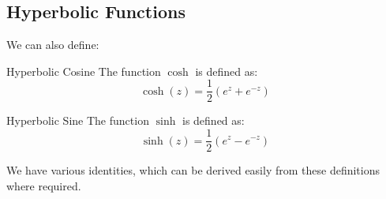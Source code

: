 \documentclass[../Main.tex]{subfiles}
\begin{document}
\subsection{Hyperbolic Functions}
We can also define:
\begin{definition}{Hyperbolic Cosine}
    The function $\cosh$ is defined as:
    \begin{equation*}
        \cosh(z) = \frac{1}{2}\left(e^z + e^{-z}\right)
    \end{equation*}
\end{definition}
\begin{definition}{Hyperbolic Sine}
    The function $\sinh$ is defined as:
    \begin{equation*}
        \sinh(z) = \frac{1}{2}\left(e^z - e^{-z}\right)
    \end{equation*}
\end{definition}
We have various identities, which can be derived easily from these definitions where required.
\end{document}
